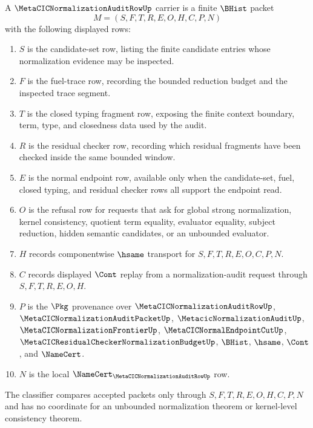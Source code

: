 \begin{definition}
\label{def:metacic-normalization-audit-row-carrier}
A $\MetaCICNormalizationAuditRowUp$ carrier is a finite $\BHist$ packet
$$
M=(S,F,T,R,E,O,H,C,P,N)
$$
with the following displayed rows:
\begin{enumerate}
\item $S$ is the candidate-set row, listing the finite candidate entries whose normalization evidence may be inspected.
\item $F$ is the fuel-trace row, recording the bounded reduction budget and the inspected trace segment.
\item $T$ is the closed typing fragment row, exposing the finite context boundary, term, type, and closedness data used by the audit.
\item $R$ is the residual checker row, recording which residual fragments have been checked inside the same bounded window.
\item $E$ is the normal endpoint row, available only when the candidate-set, fuel, closed typing, and residual checker rows all support the endpoint read.
\item $O$ is the refusal row for requests that ask for global strong normalization, kernel consistency, quotient term equality, evaluator equality, subject reduction, hidden semantic candidates, or an unbounded evaluator.
\item $H$ records componentwise $\hsame$ transport for $S,F,T,R,E,O,C,P,N$.
\item $C$ records displayed $\Cont$ replay from a normalization-audit request through $S,F,T,R,E,O,H$.
\item $P$ is the $\Pkg$ provenance over $\MetaCICNormalizationAuditRowUp$, $\MetaCICNormalizationAuditPacketUp$, $\MetacicNormalizationAuditUp$, $\MetaCICNormalizationFrontierUp$, $\MetaCICNormalEndpointCutUp$, $\MetaCICResidualCheckerNormalizationBudgetUp$, $\BHist$, $\hsame$, $\Cont$, and $\NameCert$.
\item $N$ is the local $\NameCert_{\MetaCICNormalizationAuditRowUp}$ row.
\end{enumerate}
The classifier compares accepted packets only through $S,F,T,R,E,O,H,C,P,N$ and has no coordinate for an unbounded normalization theorem or kernel-level consistency theorem.
\end{definition}

